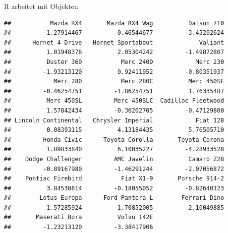 \documentclass[
  ignorenonframetext,
]{beamer}
\begin{document}
\begin{frame}[fragile]{R arbeitet mit Objekten}
\begin{verbatim}
##           Mazda RX4       Mazda RX4 Wag          Datsun 710 
##         -1.27914467         -0.46544677         -3.45202624 
##      Hornet 4 Drive   Hornet Sportabout             Valiant 
##          1.01948376          2.05304242         -1.49872807 
##          Duster 360           Merc 240D            Merc 230 
##         -1.93213120          0.92411952         -0.80351937 
##            Merc 280           Merc 280C          Merc 450SE 
##         -0.46254751         -1.86254751          1.76335487 
##          Merc 450SL         Merc 450SLC  Cadillac Fleetwood 
##          1.57842434         -0.36202705         -0.47129800 
## Lincoln Continental   Chrysler Imperial            Fiat 128 
##          0.08393115          4.13184435          5.76505710 
##         Honda Civic      Toyota Corolla       Toyota Corona 
##          1.89833840          6.10035227         -4.28933528 
##    Dodge Challenger         AMC Javelin          Camaro Z28 
##         -0.89167980         -1.46291244         -2.07056872 
##    Pontiac Firebird           Fiat X1-9       Porsche 914-2 
##          3.84538614         -0.18055052         -0.82640123 
##        Lotus Europa      Ford Pantera L        Ferrari Dino 
##          1.57285924         -1.70852005         -2.10049885 
##       Maserati Bora          Volvo 142E 
##         -1.23213120         -3.38417906
\end{verbatim}

\end{frame}
\end{document}
